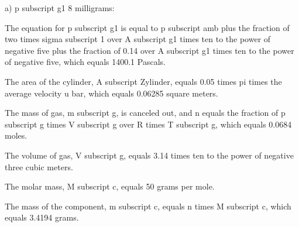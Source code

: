 a) p subscript g1 8 milligrams:

The equation for p subscript g1 is equal to p subscript amb plus the fraction of two times sigma subscript 1 over A subscript g1 times ten to the power of negative five plus the fraction of 0.14 over A subscript g1 times ten to the power of negative five, which equals 1400.1 Pascals.

The area of the cylinder, A subscript Zylinder, equals 0.05 times pi times the average velocity u bar, which equals 0.06285 square meters.

The mass of gas, m subscript g, is canceled out, and n equals the fraction of p subscript g times V subscript g over R times T subscript g, which equals 0.0684 moles.

The volume of gas, V subscript g, equals 3.14 times ten to the power of negative three cubic meters.

The molar mass, M subscript c, equals 50 grams per mole.

The mass of the component, m subscript c, equals n times M subscript c, which equals 3.4194 grams.